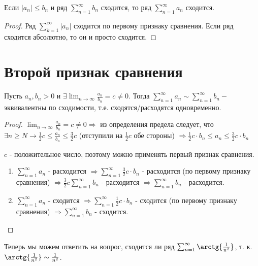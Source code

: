 	\begin{corollary}
		Если $|a_n| \leqslant b_n$ и ряд $\displaystyle \sum_{n = 1}^{\infty} b_n$ сходится, то ряд $\displaystyle \sum_{n = 1}^{\infty} a_n$ сходится.
	\end{corollary}
	
	\begin{proof}
		Ряд $\sum_{k = 1}^{\infty} |a_n|$ сходится по первому признаку сравнения. Если ряд сходится абсолютно, то он и просто сходится.
	\end{proof}
	
	\section{Второй признак сравнения}
	
	\begin{theorem}
		Пусть $a_n, b_n > 0$ и $\displaystyle \exists \lim_{n \to \infty} {\frac{a_n}{b_n}} = c \neq 0$. Тогда $\displaystyle \sum_{n = 1}^{\infty} a_n \sim \sum_{n = 1}^{\infty} b_n -$ эквивалентны по сходимости, т.е. сходятся/расходятся одновременно.
	\end{theorem}
	
	\begin{proof}
		$\lim_{n \to \infty} \frac{a_n}{b_n} = c \neq 0 \Rightarrow$ из определения предела следует, что $\exists n \geqslant N \rightarrow \frac{1}{2} c \leqslant \frac{a_n}{b_n} \leqslant \frac{3}{2} c$ (отступили на $\frac{1}{2}c$ обе стороны) $\Rightarrow \frac{1}{2} c \cdot b_n \leqslant a_n \leqslant \frac{3}{2} c \cdot b_n$
		
		$c$ - положительное число, поэтому можно применять первый признак сравнения.
		
		\begin{enumerate}
			\item $\sum_{n = 1}^{\infty} a_n$ - расходится $\Rightarrow \sum_{n = 1}^{\infty} \frac{3}{2} c \cdot b_n$ - расходится (по первому признаку сравнения) $\Rightarrow \frac{3}{2} c \sum_{n = 1}^{\infty} b_n$ - расходится $\Rightarrow \sum_{n = 1}^{\infty} b_n$ - расходится.
			\item $\sum_{n = 1}^{\infty} a_n$ - сходится $\Rightarrow \sum_{n = 1}^{\infty} \frac{1}{2} c \cdot b_n$ - сходится (по первому признаку сравнения) $\Rightarrow \sum_{n = 1}^{\infty} b_n$ - сходится.
		\end{enumerate}
	\end{proof}
	
	\begin{example}
		Теперь мы можем ответить на вопрос, сходится ли ряд $\sum_{n = 1}^{\infty} \arctg{\frac{1}{n^2}}$, т. к. $\arctg{\frac{1}{n^2}} \sim \frac{1}{n^2}$.
	\end{example}
	
